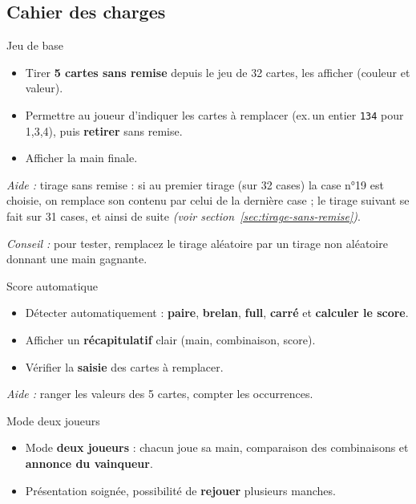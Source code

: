 \subsection*{Cahier des charges}
\begin{UPSTICahierDesCharges}{Jeu de base}
\begin{itemize}
  \item Tirer \textbf{5 cartes sans remise} depuis le jeu de 32 cartes, les afficher (couleur et valeur).
  \item Permettre au joueur d’indiquer les cartes à remplacer (ex.\,un entier \texttt{134} pour 1,3,4), puis \textbf{re\-tirer} sans remise.
  \item Afficher la main finale.
\end{itemize}
\textit{Aide :} tirage sans remise : si au premier tirage (sur 32 cases) la case n°19 est choisie, on remplace son contenu par celui de la dernière case ; le tirage suivant se fait sur 31 cases, et ainsi de suite \textit{(voir section~\ref{sec:tirage-sans-remise})}.

\textit{Conseil :} pour tester, remplacez le tirage aléatoire par un tirage non aléatoire donnant une main gagnante.
\end{UPSTICahierDesCharges}

\begin{UPSTICahierDesCharges}{Score automatique}
\begin{itemize}
  \item Détecter automatiquement : \textbf{paire}, \textbf{brelan}, \textbf{full}, \textbf{carré} et \textbf{calculer le score}.
  \item Afficher un \textbf{récapitulatif} clair (main, combinaison, score).
  \item Vérifier la \textbf{saisie} des cartes à remplacer.
\end{itemize}
\textit{Aide :} ranger les valeurs des 5 cartes, compter les occurrences.
\end{UPSTICahierDesCharges}

\begin{UPSTICahierDesCharges}{Mode deux joueurs}
\begin{itemize}
  \item Mode \textbf{deux joueurs} : chacun joue sa main, comparaison des combinaisons et \textbf{annonce du vainqueur}.
  \item Présentation soignée, possibilité de \textbf{rejouer} plusieurs manches.
\end{itemize}
\end{UPSTICahierDesCharges}

